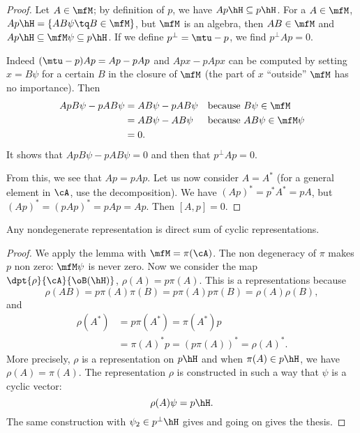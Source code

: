 \begin{proof}
Let $A\in\mfM$; by definition of $p$, we have $Ap\hH\subseteq p\hH$. For a $A\in\mfM$, $Ap\hH=\{ AB\psi\tq B\in\mfM \}$, but $\mfM$ is an algebra, then $AB\in\mfM$ and $Ap\hH\subseteq\mfM\psi\subseteq p\hH$. If we define $p^{\perp}=\mtu-p$, we find $p^{\perp}Ap=0$.

 Indeed $(\mtu-p)Ap=Ap-pAp$ and $Apx-pApx$ can be computed by setting $x=B\psi$ for a certain $B$ in the closure of $\mfM$ (the part of $x$ ``outside'' $\mfM$ has no importance). Then
\begin{equation}
\begin{aligned}
   ApB \psi-pAB\psi&=AB\psi-pAB\psi  &&\textrm{because $B\psi\in\mfM$}\\
        &=AB\psi-AB\psi  &&\textrm{because $AB\psi\in\mfM\psi$}\\
        &=0.
\end{aligned}
\end{equation}
It shows that $ApB\psi-pAB\psi=0$ and then that $p^{\perp}Ap=0$.

From this, we see that $Ap=pAp$. Let us now consider $A=A^*$ (for a general element in $\cA$, use the decomposition). We have $(Ap)^*=p^*A^*=pA$, but $(Ap)^*=(pAp)^*=pAp=Ap$. Then $[A,p]=0$.


\end{proof}


\begin{proposition}
Any nondegenerate representation is direct sum of cyclic representations.
\end{proposition}

\begin{proof}
We apply the lemma with $\mfM=\pi(\cA)$. The non degeneracy of $\pi$ makes $p$ non zero: $\mfM\psi$ is never zero. Now we consider the map $\dpt{\rho}{\cA}{\oB(\hH)}$, $\rho(A)=p \pi(A)$. This is a representations because
\begin{equation}
    \rho(AB)=p\pi(A)\pi(B)
        =p\pi(A)p\pi(B)
        =\rho(A)\rho(B),
\end{equation}
and
\begin{equation}
\begin{split}
\rho(A^*)&=p\pi(A^*)=\pi(A^*)p\\
        &=\pi(A)^*p=(p\pi(A))^*=\rho(A)^*.
\end{split}
\end{equation}
More precisely, $\rho$ is a representation on $p\hH$ and when $\pi(A)\in p\hH$, we have $\rho(A)=\pi(A)$. The representation $\rho$ is constructed in such a way that $\psi$ is a cyclic vector:
\[
  \rho(A)\psi=p\hH.
\]
The same construction with $\psi_2\in p^{\perp}\hH$ gives and going on gives the thesis.
\end{proof}


